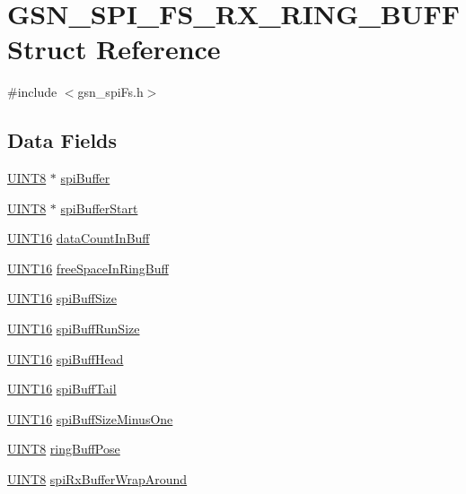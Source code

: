 \hypertarget{a00236}{
\section{GSN\_\-SPI\_\-FS\_\-RX\_\-RING\_\-BUFF Struct Reference}
\label{a00236}
}


{\ttfamily \#include $<$gsn\_\-spiFs.h$>$}

\subsection*{Data Fields}
\begin{DoxyCompactItemize}
\item 
\hyperlink{a00660_gab27e9918b538ce9d8ca692479b375b6a}{UINT8} $\ast$ \hyperlink{a00236_a03498c76fbc1ee700292158aac3f6cfc}{spiBuffer}
\item 
\hyperlink{a00660_gab27e9918b538ce9d8ca692479b375b6a}{UINT8} $\ast$ \hyperlink{a00236_a336bbabfb41452220049e5b26cf9df5b}{spiBufferStart}
\item 
\hyperlink{a00660_ga09f1a1fb2293e33483cc8d44aefb1eb1}{UINT16} \hyperlink{a00236_afad3428c32115bced8d2e82d5dbcb05e}{dataCountInBuff}
\item 
\hyperlink{a00660_ga09f1a1fb2293e33483cc8d44aefb1eb1}{UINT16} \hyperlink{a00236_a75fb4184122e9395a04e0fbb282f8396}{freeSpaceInRingBuff}
\item 
\hyperlink{a00660_ga09f1a1fb2293e33483cc8d44aefb1eb1}{UINT16} \hyperlink{a00236_a7015ecf2e079b914011daba0d4146670}{spiBuffSize}
\item 
\hyperlink{a00660_ga09f1a1fb2293e33483cc8d44aefb1eb1}{UINT16} \hyperlink{a00236_a29d6da30924bcfcde7b512dc78dc4b76}{spiBuffRunSize}
\item 
\hyperlink{a00660_ga09f1a1fb2293e33483cc8d44aefb1eb1}{UINT16} \hyperlink{a00236_a18fdf23d4c7a25c4f8822c7183fe746f}{spiBuffHead}
\item 
\hyperlink{a00660_ga09f1a1fb2293e33483cc8d44aefb1eb1}{UINT16} \hyperlink{a00236_a0f15b8dada019c7bc412bb5577e7e1a9}{spiBuffTail}
\item 
\hyperlink{a00660_ga09f1a1fb2293e33483cc8d44aefb1eb1}{UINT16} \hyperlink{a00236_ac0819f802dab9ed6eeb2618636615369}{spiBuffSizeMinusOne}
\item 
\hyperlink{a00660_gab27e9918b538ce9d8ca692479b375b6a}{UINT8} \hyperlink{a00236_a18788ee595f89a60c5e0d6ce24f439ef}{ringBuffPose}
\item 
\hyperlink{a00660_gab27e9918b538ce9d8ca692479b375b6a}{UINT8} \hyperlink{a00236_a96a5d87289fc127e9767d76752758b9e}{spiRxBufferWrapAround}
\end{DoxyCompactItemize}


